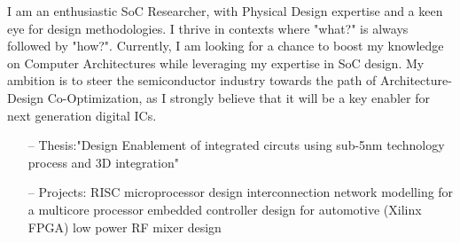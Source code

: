\documentclass[10pt,a4paper]{altacv}
\begin{document}
%

\begin{fullwidth}
\makecvheader
{}
\justify 
\small{I am an enthusiastic SoC Researcher, with Physical Design expertise and a keen eye for design methodologies. I thrive in contexts where "what?" is always followed by "how?". Currently, I am looking for a chance to boost my knowledge on Computer Architectures while leveraging my expertise in SoC design. My ambition is to steer the semiconductor industry towards the path of  Architecture-Design Co-Optimization, as I strongly believe that it will be a key enabler for next generation digital ICs.}
\end{fullwidth}

%




\begin{itemize}
    \setlength{\itemindent}{0.5em}
    \item[--] \small{Thesis:"Design Enablement of integrated circuts using sub-5nm technology process and 3D integration"}
\end{itemize}
\medskip


 \begin{itemize}
    \setlength{\itemindent}{0.5em}
    \item[--] \small{Projects: RISC microprocessor design \textbullet\hspace{0.1em} interconnection network modelling for a multicore processor \textbullet\hspace{0.1em} embedded controller design for automotive (Xilinx FPGA) \textbullet\hspace{0.1em} low power RF mixer design}
\end{itemize}
\end{document}
